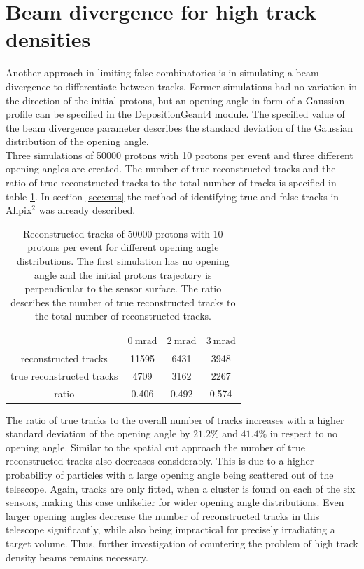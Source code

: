 \section{Beam divergence for high track densities}
Another approach in limiting false combinatorics is in simulating a beam divergence to differentiate between tracks. Former simulations had no variation
in the direction of the initial protons, but an opening angle in form of a Gaussian profile can be specified in the DepositionGeant4 module. The specified value of
the beam divergence parameter describes the standard deviation of the Gaussian distribution of the opening angle.  \\
Three simulations of 50000 protons with 10 protons per event and three different opening angles are created.
The number of true reconstructed tracks and the ratio
of true reconstructed tracks to the total number of tracks is specified in table \ref{tab:angle}. In section \ref{sec:cuts} the method of identifying
true and false tracks in Allpix$^2$ was already described.

\begin{table}
  \centering
  \begin{tabular}{c | c c c}
    \toprule
     &  $\SI{0}{\milli\radian}$ & $\SI{2}{\milli\radian}$ & $\SI{3}{\milli\radian}$\\
    \midrule
    reconstructed tracks & 11595 & 6431 & 3948  \\
    true reconstructed tracks & 4709 & 3162 & 2267 \\
    ratio & 0.406 & 0.492 & 0.574
  \end{tabular}
  \caption{Reconstructed tracks of 50000 protons with 10 protons per event for different opening angle
  distributions. The first simulation has no opening angle and the initial protons
  trajectory is perpendicular to the sensor surface.
  The ratio describes the number of true reconstructed tracks to the total number of reconstructed tracks.}
  \label{tab:angle}
\end{table}

The ratio of true tracks to the overall number of tracks increases with a higher standard deviation of the opening angle by $21.2\%$ and $41.4\%$ in respect to
no opening angle. Similar to the spatial cut approach the
number of true reconstructed tracks also decreases considerably. This is due to a higher probability of particles with a large opening angle being scattered out of the telescope.
Again, tracks are only fitted, when a cluster is found on each of the six sensors, making this case unlikelier for wider opening angle distributions.
Even larger opening angles decrease the number of reconstructed tracks in this telescope significantly, while also being impractical for precisely irradiating a target volume.
Thus, further investigation of countering the problem of high track density beams remains necessary.

